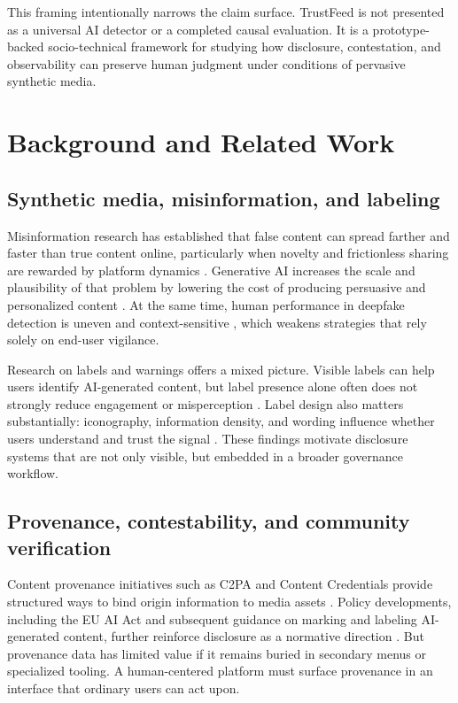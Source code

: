 \documentclass[acmlarge,screen,nonacm]{acmart}
\begin{document}
This framing intentionally narrows the claim surface. TrustFeed is not presented as a universal AI detector or a completed causal evaluation. It is a prototype-backed socio-technical framework for studying how disclosure, contestation, and observability can preserve human judgment under conditions of pervasive synthetic media.

\section{Background and Related Work}

\subsection{Synthetic media, misinformation, and labeling}

Misinformation research has established that false content can spread farther and faster than true content online, particularly when novelty and frictionless sharing are rewarded by platform dynamics \cite{lazer2018sciencefake, vosoughi2018spread}. Generative AI increases the scale and plausibility of that problem by lowering the cost of producing persuasive and personalized content \cite{goldstein2023generative}. At the same time, human performance in deepfake detection is uneven and context-sensitive \cite{tolosana2020deepfakes, somoray2025deepfake}, which weakens strategies that rely solely on end-user vigilance.

Research on labels and warnings offers a mixed picture. Visible labels can help users identify AI-generated content, but label presence alone often does not strongly reduce engagement or misperception \cite{aslett2022labels, li2024aigclabels, wittenberg2025labeling}. Label design also matters substantially: iconography, information density, and wording influence whether users understand and trust the signal \cite{gamage2025labeling}. These findings motivate disclosure systems that are not only visible, but embedded in a broader governance workflow.

\subsection{Provenance, contestability, and community verification}

Content provenance initiatives such as C2PA and Content Credentials provide structured ways to bind origin information to media assets \cite{c2pa2025spec, cai2026howitworks}. Policy developments, including the EU AI Act and subsequent guidance on marking and labeling AI-generated content, further reinforce disclosure as a normative direction \cite{euai2024, eucommission2026}. But provenance data has limited value if it remains buried in secondary menus or specialized tooling. A human-centered platform must surface provenance in an interface that ordinary users can act upon.
\end{document}
